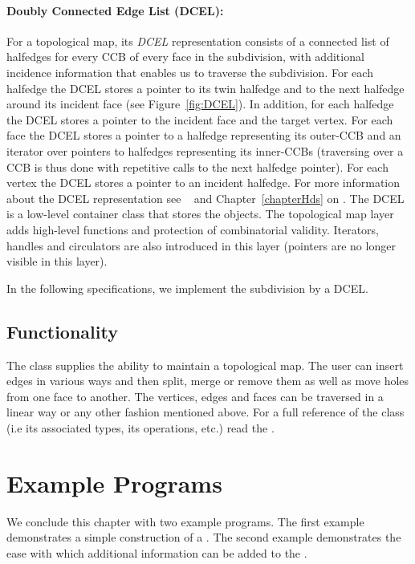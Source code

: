 \paragraph{Doubly Connected Edge List (DCEL):}
For a topological map, its {\em DCEL} representation consists of a
connected list of halfedges for every CCB of every face in the
subdivision, with additional incidence information that enables us to
traverse the subdivision. %
For each halfedge the DCEL
stores a pointer to its twin halfedge and to the next
halfedge around its incident face (see Figure~\ref{fig:DCEL}). In
addition, for each halfedge the DCEL stores a pointer to the incident
face and the target vertex.
For each face the DCEL stores a pointer to a halfedge representing
its outer-CCB and an iterator over pointers to halfedges representing
its inner-CCBs (traversing over a CCB is thus done with repetitive
calls to the next halfedge pointer).
For each vertex the DCEL stores a pointer to an incident halfedge. 
For more information about the DCEL
representation see ~\cite{bkos-cgaa-97} and Chapter~\ref{chapterHds}
on .
The DCEL is a low-level container class that stores the objects.
The topological map layer adds high-level functions and protection of
combinatorial validity. Iterators, handles and circulators are also
introduced in this layer (pointers are no longer visible in this layer).

In the following
specifications, we implement the subdivision by a DCEL. 

\subsection*{Functionality}

The class  supplies the ability to maintain
a topological map. The user can insert edges in various ways and then split,
merge or remove them as well as move holes from one face to another.
The vertices, edges and faces can be traversed in a 
linear way or any other fashion mentioned above.
For a full reference of the class (i.e its associated types,
its operations, etc.) read the .


\section{Example Programs}
\label{TPM_sec:example}
We conclude this chapter with two example programs. The first example
demonstrates a simple construction of a . The 
second example demonstrates the ease with which additional information can
be added to the .

